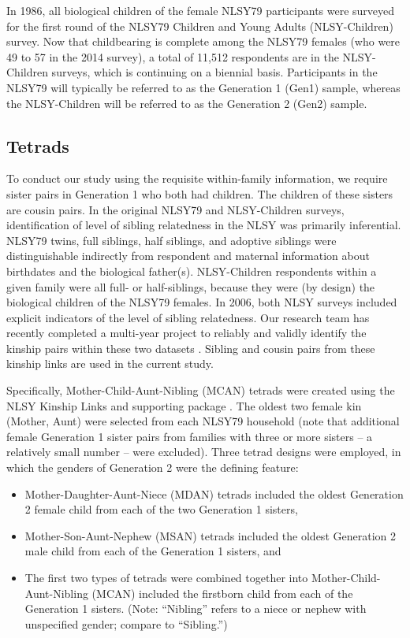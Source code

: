 \documentclass[a4paper,man,apacite,natbib,12pt,longtable]{apa6}\usepackage[]{graphicx}\usepackage[]{color}
\begin{document}
In 1986, all biological children of the female NLSY79 participants were surveyed for the first round of the NLSY79 Children and Young Adults (NLSY-Children) survey. Now that childbearing is complete among the NLSY79 females (who were 49 to 57 in the 2014 survey), a total of 11,512 respondents are in the NLSY-Children surveys, which is continuing on a biennial basis. Participants in the NLSY79 will typically be referred to as the Generation 1 (Gen1) sample, whereas the NLSY-Children will be referred to as the Generation 2 (Gen2) sample.
%
\subsection{Tetrads}
To conduct our study using the requisite within-family information, we require sister pairs in Generation 1 who both had children. The children of these sisters are cousin pairs. In the original NLSY79 and NLSY-Children surveys, identification of level of sibling relatedness in the NLSY was primarily inferential. NLSY79 twins, full siblings, half siblings, and adoptive siblings were distinguishable indirectly from respondent and maternal information about birthdates and the biological father(s). NLSY-Children respondents within a given family were all full- or half-siblings, because they were (by design) the biological children of the NLSY79 females. In 2006, both NLSY surveys included explicit indicators of the level of sibling relatedness. Our research team has recently completed a multi-year project to reliably and validly identify the kinship pairs within these two datasets \citep{nlsylinksbgpaper}. Sibling and cousin pairs from these kinship links are used in the current study.

Specifically, Mother-Child-Aunt-Nibling (MCAN) tetrads were created using the NLSY Kinship Links \citep{nlsylinksbgpaper} and supporting \R package \citep{nlsylinksr}. The oldest two female kin (Mother, Aunt) were selected from each NLSY79 household (note that additional female Generation 1 sister pairs from families with three or more sisters -- a relatively small number -- were excluded). Three tetrad designs were employed, in which the genders of Generation 2 were the defining feature: 
\begin{itemize}\item Mother-Daughter-Aunt-Niece (MDAN) tetrads included the oldest Generation 2 female child from each of the two Generation 1 sisters, 
\item Mother-Son-Aunt-Nephew (MSAN) tetrads included the oldest Generation 2 male child from each of the Generation 1 sisters, and 
\item The first two types of tetrads were combined together into Mother-Child-Aunt-Nibling (MCAN) included the firstborn child from each of the Generation 1 sisters. (Note: ``Nibling'' refers to a niece or nephew with unspecified gender; compare to ``Sibling.'')\end{itemize} 
\end{document}
